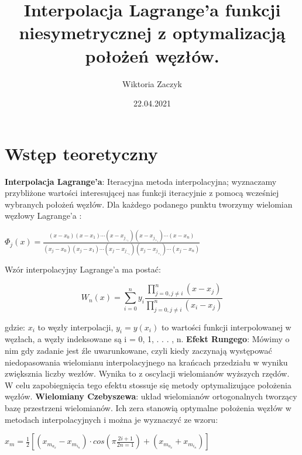 \documentclass{article}
\title{Interpolacja Lagrange’a funkcji niesymetrycznej z
optymalizacją położeń węzłów.
}
\author{Wiktoria Zaczyk}
\date{22.04.2021}
\begin{document}
\maketitle

\section{Wstęp teoretyczny}

\newline\newline
\textbf{Interpolacja Lagrange’a}:
\newline
Iteracyjna metoda interpolacyjna; wyznaczamy przybliżone wartości interesującej nas funkcji iteracyjnie  z pomocą wcześniej wybranych
położeń węzłów. Dla każdego podanego punktu tworzymy wielomian węzłowy Lagrange’a :

\begin{center}
$\Phi_j(x) = \frac{(x-x_0)(x-x_1)\cdots (x-x_j_-_1)(x-x_j_+_1) \cdots (x-x_n) }{(x_j-x_0)(x_j-x_1)\cdots (x_j-x_j_-_1)(x_j-x_j_+_1) \cdots (x_j-x_n)}$
\end{center}
\newline
Wzór interpolacyjny Lagrange'a ma postać:

\begin{center}
    \[ W_n(x)=\sum_{i=0}^{n}y_i  \frac{ \prod_{j=0, j \neq i}^{n} (x-x_j) }{\prod_{j=0, j \neq i}^{n} (x_i-x_j)}\]
\end{center}
\newline
gdzie: $x_i$ to węzły interpolacji, $y_i = y(x_i)$ to wartości funkcji interpolowanej w węzłach, a
węzły indeksowane są i = 0, 1, . . . , n.\newline
\newline
\textbf{Efekt Rungego}:
\newline
Mówimy o nim gdy zadanie jest źle uwarunkowane, czyli kiedy zaczynają występować niedopasowania wielomianu interpolacyjnego na krańcach przedziału w wyniku zwiększnia liczby wezłów. Wynika to z oscylacji wielomianów wyższych rzędów. W celu zapobiegnięcia tego efektu stossuje się metody optymalizujące położenia węzłów.\newline
\newline
\textbf{Wielomiany Czebyszewa}:
\newline
układ wielomianów ortogonalnych tworzący bazę przestrzeni
wielomianów. Ich zera stanowią optymalne położenia węzłów w metodach interpolacyjnych
i można je wyznaczyć ze wzoru:

\begin{center}
    $x_m =\frac{1}{2} [(x_m_a_x-x_m_i_n)\cdot cos(\pi \frac{2i+1}{2n=1})+(x_m_a_x+x_m_i_n)]$
\end{center}
\end{document}
